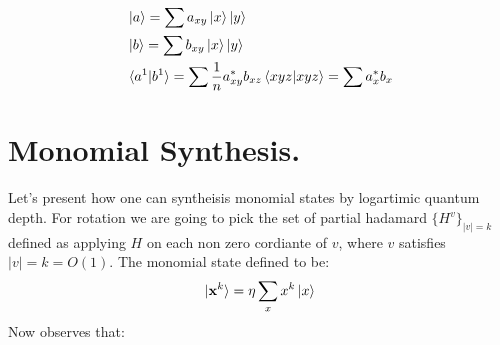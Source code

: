 \documentclass[manuscript,screen,review]{acmart}
\begin{document}
\begin{equation*}
  \begin{split}
    & \ket{a} = \sum a_{xy}\ket{x}\ket{y} \\
    & \ket{b} = \sum b_{xy}\ket{x}\ket{y} \\ 
    & \braket{a^{1}|b^{1}} = \sum \frac{1}{n}a_{xy}^{*}b_{xz}\braket{xyz|xyz} = \sum a_{x}^{*}b_{x}
  \end{split}
\end{equation*}


 


\section{Monomial Synthesis.}
Let's present how one can syntheisis monomial states by logartimic quantum depth. For rotation we are going to pick the set of partial hadamard $\{H^{v}\}_{|v| = k} $ defined as applying $H$ on each non zero cordiante of $v$, where $v$ satisfies $|v| = k = O(1)$. The monomial state defined to be: 
\begin{equation*}
  \begin{split}
    \ket{\mathbf{x}^{k}} = \eta \sum_{x}x^{k}\ket{x}
  \end{split}
\end{equation*}
Now observes that:
\end{document}
